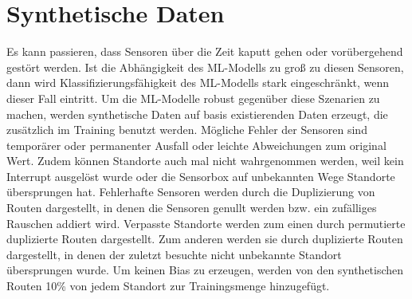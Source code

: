 \section{Synthetische Daten}
Es kann passieren, dass Sensoren über die Zeit kaputt gehen oder vorübergehend gestört werden.
Ist die Abhängigkeit des ML-Modells zu groß zu diesen Sensoren, dann wird Klassifizierungsfähigkeit des ML-Modells stark eingeschränkt, wenn dieser Fall eintritt.
Um die ML-Modelle robust gegenüber diese Szenarien zu machen, werden synthetische Daten auf basis existierenden Daten erzeugt, die zusätzlich im Training benutzt werden.
\newline
\newline
Mögliche Fehler der Sensoren sind temporärer oder permanenter Ausfall oder leichte Abweichungen zum original Wert.
Zudem können Standorte auch mal nicht wahrgenommen werden, weil kein Interrupt ausgelöst wurde oder die Sensorbox
auf unbekannten Wege Standorte übersprungen hat.
\newline
\newline
Fehlerhafte Sensoren werden durch die Duplizierung von Routen dargestellt, in denen die Sensoren genullt werden bzw. ein zufälliges Rauschen addiert wird.
Verpasste Standorte werden zum einen durch permutierte duplizierte Routen dargestellt.
Zum anderen werden sie durch duplizierte Routen dargestellt, in denen der zuletzt besuchte nicht unbekannte Standort übersprungen wurde.
Um keinen Bias zu erzeugen, werden von den synthetischen Routen 10\% von jedem Standort zur Trainingsmenge hinzugefügt.